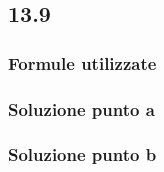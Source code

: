 \documentclass[../../main.tex]{subfiles}
\begin{document}
\subsection*{13.9}
\subsubsection*{Formule utilizzate}
\subsubsection*{Soluzione punto a}
\subsubsection*{Soluzione punto b}
\newpage
\end{document}
